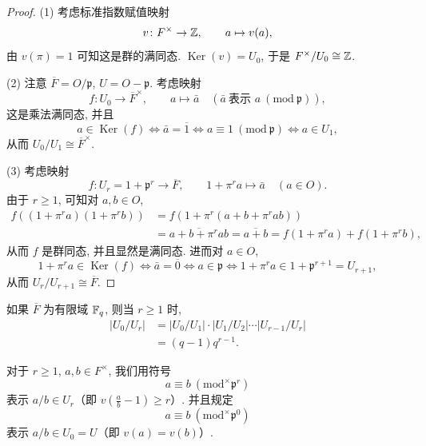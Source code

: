 \begin{proof}
(1) 考虑标准指数赋值映射
\[
  v\colon F^{\times}\to\mathbb{Z},\qquad a\mapsto v(a),
\]
由 $v(\pi)=1$ 可知这是群的满同态. $\operatorname{Ker}(v)=U_0$, 于是 $F^{\times}/U_0\cong\mathbb{Z}$.

(2) 注意 $\overline{F}=O/\mathfrak{p}$, $U=O-\mathfrak{p}$. 考虑映射
\[
  f\colon U_0\to\overline{F}^{\times},\qquad a\mapsto\bar{a}\quad(\bar{a}\ \text{表示 } a\ (\mathrm{mod}\ \mathfrak{p})),
\]
这是乘法满同态, 并且
\[
  a\in\operatorname{Ker}(f)\Leftrightarrow\bar{a}=\overline{1}\Leftrightarrow a\equiv 1\ (\mathrm{mod}\ \mathfrak{p})\Leftrightarrow a\in U_1,
\]
从而 $U_0/U_1\cong\overline{F}^{\times}$.

(3) 考虑映射
\[
  f\colon U_r=1+\mathfrak{p}^r\to\overline{F},\qquad 1+\pi^ra\mapsto\bar{a}\quad(a\in O).
\]
由于 $r\geqslant 1$, 可知对 $a,b\in O$,
\begin{align*}
  f((1+\pi^ra)(1+\pi^rb))&=f(1+\pi^r(a+b+\pi^rab))\\
  &=\overline{a+b+\pi^rab}=\overline{a+b}=f(1+\pi^ra)+f(1+\pi^rb),
\end{align*}
从而 $f$ 是群同态, 并且显然是满同态. 进而对 $a\in O$,
\[
  1+\pi^ra\in\operatorname{Ker}(f)\Leftrightarrow\bar{a}=\overline{0}\Leftrightarrow a\in\mathfrak{p}
  \Leftrightarrow 1+\pi^ra\in 1+\mathfrak{p}^{r+1}=U_{r+1},
\]
从而 $U_r/U_{r+1}\cong\overline{F}$.
\end{proof}

\begin{remark}
如果 $\overline{F}$ 为有限域 $\mathbb{F}_q$, 则当 $r\geqslant 1$ 时,
\begin{align*}
  |U_0/U_r|&=|U_0/U_1|\cdot|U_1/U_2|\cdots|U_{r-1}/U_r|\\
  &=(q-1)q^{r-1}.
\end{align*}

对于 $r\geqslant 1$, $a,b\in F^{\times}$, 我们用符号
\[
  a\equiv b\ (\mathrm{mod}^{\times}\mathfrak{p}^r)
\]
表示 $a/b\in U_r$（即 $v\left(\frac{a}{b}-1\right)\geqslant r$）. 并且规定
\[
  a\equiv b\ (\mathrm{mod}^{\times}\mathfrak{p}^0)
\]
表示 $a/b\in U_0=U$（即 $v(a)=v(b)$）.
\end{remark}

